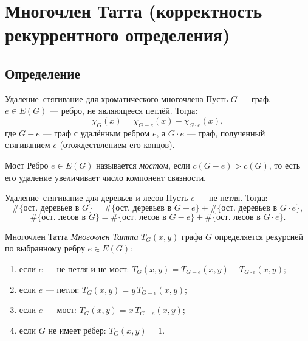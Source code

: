 
\section{Многочлен Татта (корректность рекуррентного определения)}

\subsection{Определение}

\begin{Statement}{Удаление--стягивание для хроматического многочлена}{}
  Пусть $G$ --- граф, $e\in E(G)$ --- ребро, не являющееся петлёй. Тогда:
  \[
    \chi_G(x) = \chi_{G-e}(x) - \chi_{G \cdot e}(x),
  \]
  где $G-e$ --- граф с удалённым ребром $e$, а $G \cdot e$ --- граф,
  полученный стягиванием $e$ (отождествлением его концов).
\end{Statement}

\begin{Definition}{Мост}{}
  Ребро $e \in E(G)$ называется \emph{мостом}, если $c(G-e) > c(G)$,
  то есть его удаление увеличивает число компонент связности.
\end{Definition}

\begin{Proposition}{Удаление--стягивание для деревьев и лесов}{}
  Пусть $e$ --- не петля. Тогда:
  \[
    \#\{\text{ост.\ деревьев в }G\}
    = \#\{\text{ост.\ деревьев в }G-e\}
    + \#\{\text{ост.\ деревьев в }G \cdot e\},
  \]
  \[
    \#\{\text{ост.\ лесов в }G\}
    = \#\{\text{ост.\ лесов в }G-e\}
    + \#\{\text{ост.\ лесов в }G \cdot e\}.
  \]
\end{Proposition}

\begin{Definition}{Многочлен Татта}{}
  \emph{Многочлен Татта} $T_G(x,y)$ графа $G$ определяется рекурсией
  по выбранному ребру $e \in E(G)$:
  \begin{enumerate}
    \item[(i)]   если $e$ --- не петля и не мост:
                 $T_G(x,y) = T_{G-e}(x,y) + T_{G \cdot e}(x,y)$;
    \item[(ii)]  если $e$ --- петля:
                 $T_G(x,y) = y\, T_{G-e}(x,y)$;
    \item[(iii)] если $e$ --- мост:
                 $T_G(x,y) = x\, T_{G-e}(x,y)$;
    \item[(iv)]  если $G$ не имеет рёбер: $T_G(x,y) = 1$.
  \end{enumerate}
\end{Definition}

